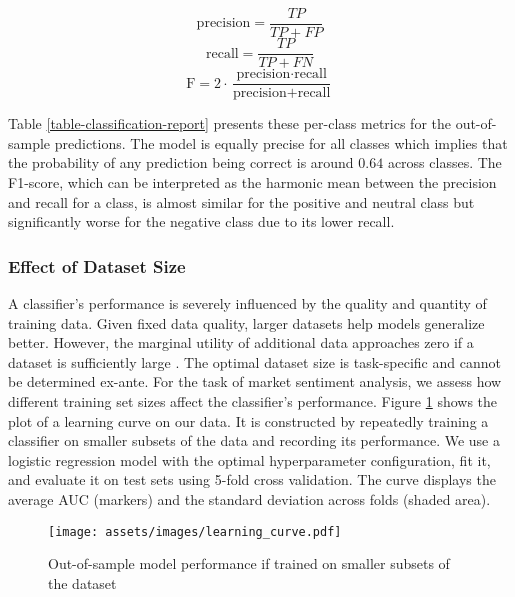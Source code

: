 \begin{equation}
	\textrm{precision} = \frac{TP}{TP + FP}
\end{equation}
\begin{equation}
	\textrm{recall} = \frac{TP}{TP + FN}
\end{equation}
\begin{equation}
	\textrm{F} = 2 \cdot \frac{\textrm{precision} \cdot \textrm{recall}}{\textrm{precision} + \textrm{recall}}
\end{equation}

Table \ref{table-classification-report} presents these per-class metrics for the out-of-sample predictions. The model is equally precise for all classes which implies that the probability of any prediction being correct is around $0.64$ across classes. The F1-score, which can be interpreted as the harmonic mean between the precision and recall for a class, is almost similar for the positive and neutral class but significantly worse for the negative class due to its lower recall. 



\subsubsection{Effect of Dataset Size}
A classifier's performance is severely influenced by the quality and quantity of training data. Given fixed data quality, larger datasets help models generalize better. However, the marginal utility of additional data approaches zero if a dataset is sufficiently large . The optimal dataset size is task-specific and cannot be determined ex-ante. For the task of market sentiment analysis, we assess how different training set sizes affect the classifier's performance. Figure \ref{figure-learning-curve} shows the plot of a learning curve on our data. It is constructed by repeatedly training a classifier on smaller subsets of the data and recording its performance. We use a logistic regression model with the optimal hyperparameter configuration, fit it, and evaluate it on test sets using 5-fold cross validation. The curve displays the average AUC (markers) and the standard deviation across folds (shaded area).

\begin{figure}[!ht]
	\centering
	\texttt{[image: assets/images/learning\_curve.pdf]}
	\caption{Out-of-sample model performance if trained on smaller subsets of the dataset}
	\label{figure-learning-curve}
\end{figure}

